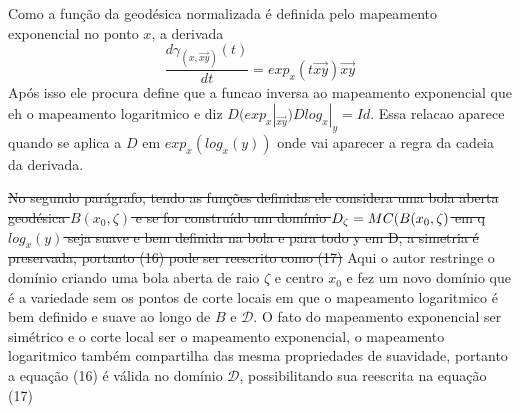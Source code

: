 \documentclass[a4paper,titlepage]{article}
\begin{document}
{Como a função da geodésica normalizada é definida pelo mapeamento exponencial no ponto $x$, a derivada 
{
\begin{equation}
	\frac{d\gamma_{(x,\overrightarrow{xy})}(t)}{dt} = exp_{x}(t \overrightarrow{xy})\overrightarrow{xy}
\end{equation}
}
Após isso ele procura define que a funcao inversa ao mapeamento exponencial que eh o mapeamento logaritmico e diz $D(exp_{x}|_{\overrightarrow{xy}})Dlog_{x}|_y=Id$. Essa relacao aparece quando se aplica a $D$ em $exp_{x}(log_x(y))$ onde vai aparecer a regra da cadeia da derivada.  

{
\vspace{1em}
\vspace{1em}
}

\sout{ No segundo parágrafo, tendo as funções definidas ele considera uma bola
aberta geodésica $B(x_0,\zeta)$ e se for construído um domínio $D_{\zeta}=M \\
C(B(x_0,\zeta)$ em q $log_{x}(y)$ seja suave e bem definida na bola e para todo y
em D, a simetria é preservada, portanto (16) pode ser reescrito como (17)}
Aqui o autor restringe o domínio criando uma bola aberta de raio $\zeta$ e centro $x_0$
e fez um novo domínio que é a variedade sem os pontos de corte locais em que o mapeamento logaritmico é bem definido e suave ao longo de $B$ e $\mathcal{D}$. O fato do mapeamento exponencial ser simétrico e o corte local ser o mapeamento exponencial, o mapeamento logaritmico também compartilha das mesma propriedades de suavidade, portanto a equação (16) é válida no domínio $\mathcal{D}$, possibilitando sua reescrita na equação (17)

}
\end{document}
